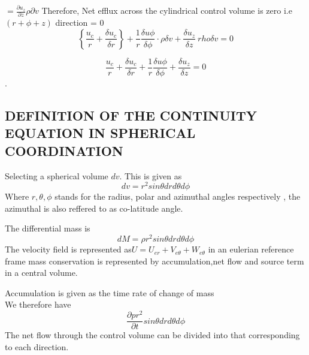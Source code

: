 \documentclass[a4paper, 12pt]{report}
\begin{document}
$\displaystyle =\frac{\partial u_z}{\partial z} \rho  \partial v $
Therefore, Net efflux across the cylindrical control volume is zero i.e $(r + \phi + z)$ direction = 0
\begin{equation*}
	\left\lbrace \frac{u_c}{r} + \frac{\delta u_c}{\delta r} \right\rbrace + \frac{1}{r} \frac{\delta u \phi}{\delta \phi} \cdot \rho \delta v + \frac{\delta u_z}{\delta z}\ rho \delta v = 0
\end{equation*}

\begin{equation*}
	\frac{u_c}{r} + \frac{\delta u_c}{\delta r} + \frac{1}{r} \frac{\delta u \phi}{\delta \phi} + \frac{\delta u_z}{\delta z} = 0
\end{equation*}.


\subsection{DEFINITION OF THE CONTINUITY EQUATION IN SPHERICAL COORDINATION}


\begin{center}
	
\end{center}

Selecting a spherical volume $dv$. This is given as 
\begin{equation*}
	dv=r^2sin\theta dr d\theta d\phi
\end{equation*}
Where $r,\theta,\phi$ stands for the  radius, polar and azimuthal angles respectively , the azimuthal is also reffered to as co-latitude angle.

The differential mass is 
\begin{equation*}
	dM=\rho{r^2sin\theta drd\theta d\phi}
\end{equation*}
The velocity field is represented as\newline $U=U_{er}+V_{e\theta}+W_{e\theta}$ in an eulerian reference frame mass conservation is represented by accumulation,net flow and source term in a central volume.

Accumulation is given as the time rate of change of mass\\
We therefore have
\begin{equation*}
	\frac{\partial pr^2}{\partial t}sin\theta dr d\theta d\phi
\end{equation*}
The net flow through the control volume can be divided into that corresponding to each direction.\\
\end{document}
